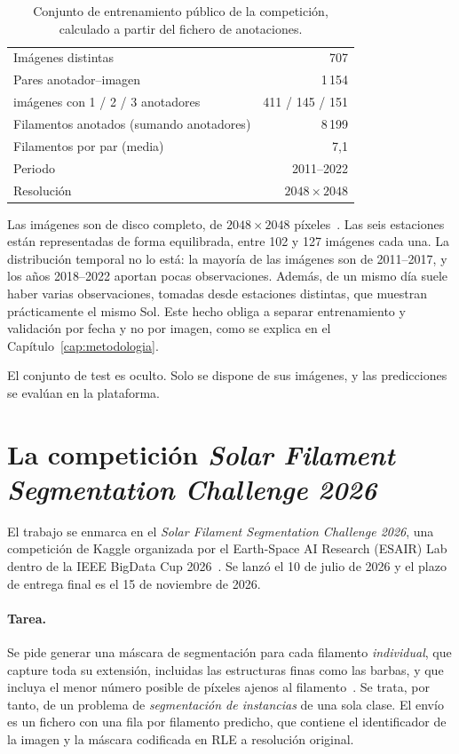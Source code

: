 \begin{table}[ht]
\centering
\begin{tabular}{@{}lr@{}}
\toprule
Imágenes distintas & 707\\
Pares anotador--imagen & 1\,154\\
\quad imágenes con 1 / 2 / 3 anotadores & 411 / 145 / 151\\
Filamentos anotados (sumando anotadores) & 8\,199\\
Filamentos por par (media) & 7{,}1\\
Periodo & 2011--2022\\
Resolución & $2048\times2048$\\
\bottomrule
\end{tabular}
\caption{Conjunto de entrenamiento público de la competición, calculado a
partir del fichero de anotaciones.}
\label{tab:datos}
\end{table}

Las imágenes son de disco completo, de $2048\times2048$
píxeles~\cite{kaggle2026}. Las seis estaciones están representadas de forma equilibrada, entre 102 y
127 imágenes cada una. La distribución temporal no lo está: la mayoría de
las imágenes son de 2011--2017, y los años 2018--2022 aportan pocas
observaciones. Además, de un mismo día suele haber varias observaciones,
tomadas desde estaciones distintas, que muestran prácticamente el mismo
Sol. Este hecho obliga a separar entrenamiento y validación por fecha y
no por imagen, como se explica en el Capítulo~\ref{cap:metodologia}.

El conjunto de test es oculto. Solo se dispone de sus imágenes, y las
predicciones se evalúan en la plataforma.

\section{La competición \emph{Solar Filament Segmentation Challenge 2026}}
\label{sec:competicion}

El trabajo se enmarca en el \emph{Solar Filament Segmentation Challenge
2026}, una competición de Kaggle organizada por el Earth-Space AI
Research (ESAIR) Lab dentro de la IEEE BigData Cup 2026~\cite{kaggle2026}.
Se lanzó el 10 de julio de 2026 y el plazo de entrega final es el 15 de
noviembre de 2026.

\paragraph{Tarea.} Se pide generar una máscara de segmentación para cada
filamento \emph{individual}, que capture toda su extensión, incluidas las
estructuras finas como las barbas, y que incluya el menor número posible
de píxeles ajenos al filamento~\cite{kaggle2026}. Se trata, por tanto, de
un problema de \emph{segmentación de instancias} de una sola clase. El
envío es un fichero con una fila por filamento predicho, que contiene el
identificador de la imagen y la máscara codificada en RLE a resolución
original.

